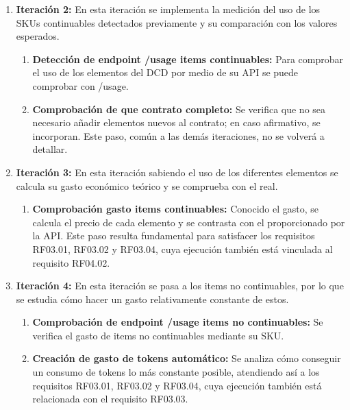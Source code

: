 \begin{enumerate}
\begin{enumerate}
\begin{enumerate}
                    \end{enumerate}


              \item \textbf{Iteración 2:} En esta iteración se implementa la medición del uso de los SKUs continuables detectados previamente y su comparación con los valores esperados.
                    \setcounter{enumiii}{0} %
                    \begin{enumerate}
                        \item \textbf{Detección de endpoint /usage items continuables: } Para comprobar el uso de los elementos del DCD por medio de su API se puede comprobar con /usage.
                        \item \textbf{Comprobación de que contrato completo:} Se verifica que no sea necesario añadir elementos nuevos al contrato; en caso afirmativo, se incorporan. Este paso, común a las demás iteraciones, no se volverá a detallar.
                    \end{enumerate}


              \item \textbf{Iteración 3:} En esta iteración sabiendo el uso de los diferentes elementos se calcula su gasto económico teórico y se comprueba con el real.
                    \setcounter{enumiii}{0} %
                    \begin{enumerate}
                        \item \textbf{Comprobación gasto items continuables: } Conocido el gasto, se calcula el precio de cada elemento y se contrasta con el proporcionado por la API. Este paso resulta fundamental para satisfacer los requisitos RF03.01, RF03.02 y RF03.04, cuya ejecución también está vinculada al requisito RF04.02.
                    \end{enumerate}


              \item \textbf{Iteración 4:} En esta iteración se pasa a los items no continuables, por lo que se estudia cómo hacer un gasto relativamente constante de estos.
                    \setcounter{enumiii}{0} %
                    \begin{enumerate}
                        \item \textbf{Comprobación de endpoint /usage items no continuables: } Se verifica el gasto de items no continuables mediante su SKU.
                        \item \textbf{Creación de gasto de tokens automático:} Se analiza cómo conseguir un consumo de tokens lo más constante posible, atendiendo así a los requisitos RF03.01, RF03.02 y RF03.04, cuya ejecución también está relacionada con el requisito RF03.03. 
                    \end{enumerate}



\end{enumerate}
\end{enumerate}
